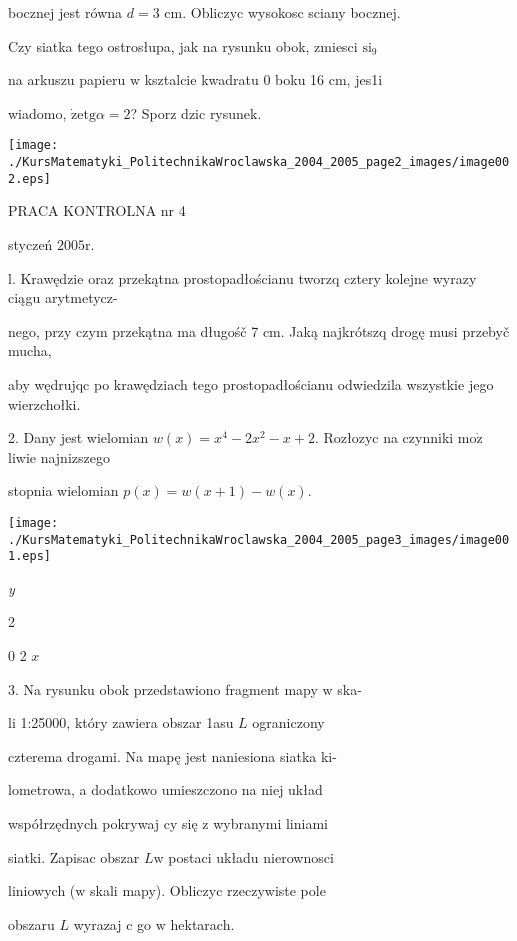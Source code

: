 \documentclass[a4paper,12pt]{article}
\begin{document}
bocznej jest równa $d=3$ cm. Obliczyc wysokosc sciany bocznej.

Czy siatka tego ostrosłupa, jak na rysunku obok, zmiesci $\mathrm{s}\mathrm{i}_{9}$

na arkuszu papieru $\mathrm{w}$ ksztalcie kwadratu $0$ boku 16 cm, jes1i

wiadomo, $\dot{\mathrm{z}}\mathrm{e}\mathrm{t}\mathrm{g}\alpha=2$? Sporz dzic rysunek.
\begin{center}
\texttt{[image: ./KursMatematyki\_PolitechnikaWroclawska\_2004\_2005\_page2\_images/image002.eps]}
\end{center}




PRACA KONTROLNA nr 4

styczeń $2005\mathrm{r}.$

l. Krawędzie oraz przekątna prostopadłościanu tworzq cztery kolejne wyrazy ciągu arytmetycz-

nego, przy czym przekątna ma długośč 7 cm. Jaką najkrótszq drogę musi przebyč mucha,

aby wędrujqc po krawędziach tego prostopadłościanu odwiedzila wszystkie jego wierzchołki.

2. Dany jest wielomian $w(x)=x^{4}-2x^{2}-x+2$. Rozłozyc na czynniki $\mathrm{m}\mathrm{o}\dot{\mathrm{z}}$ liwie najnizszego

stopnia wielomian $p(x)=w(x+1)-w(x).$
\begin{center}
\texttt{[image: ./KursMatematyki\_PolitechnikaWroclawska\_2004\_2005\_page3\_images/image001.eps]}
\end{center}
{\it y}

2

0 2 $x$

3. Na rysunku obok przedstawiono fragment mapy $\mathrm{w}$ ska-

li 1:25000, który zawiera obszar 1asu $L$ ograniczony

czterema drogami. Na mapę jest naniesiona siatka ki-

lometrowa, a dodatkowo umieszczono na niej układ

współrzędnych pokrywaj cy się $\mathrm{z}$ wybranymi liniami

siatki. Zapisac obszar $L\mathrm{w}$ postaci układu nierownosci

liniowych ($\mathrm{w}$ skali mapy). Obliczyc rzeczywiste pole

obszaru $L$ wyrazaj $\mathrm{c}$ go $\mathrm{w}$ hektarach.
\end{document}
